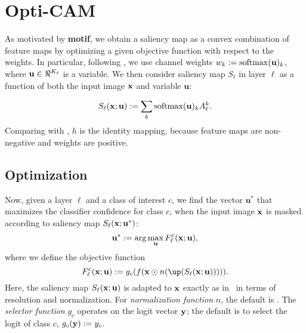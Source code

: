 \section{Opti-CAM}
As motivated by \textbf{motif}, we obtain a saliency map as a convex combination of feature maps
 by optimizing a given objective function with respect to the weights.
In particular, following \autocite{wang2020score}, we use channel weights $w_k \mathrel{:=} \operatorname{softmax}(
	\mathbf{u})_k$, where $\mathbf{u} \in \real^{K_\ell}$ is a variable.
We then consider saliency map $S_\ell$ in layer $\ell$ as a function of both the input image $\mathbf{x}$ 
and variable $\mathbf{u}$:

\begin{equation}
    S_\ell(\mathbf{x}; \mathbf{u}) \mathrel{:=} \sum_k \operatorname{softmax}(\mathbf{u})_k A^k_\ell.
\label{eq:v-sal}
\end{equation}
Comparing with , $h$ is the identity mapping, because feature maps are non-negative and
 weights are positive.


\subsection{Optimization}
Now, given a layer $\ell$ and a class of interest $c$, we find the vector $\mathbf{u}^*$ that
 maximizes the classifier confidence for class $c$, when the input image $\mathbf{x}$ is masked according 
 to saliency map $S_\ell(\mathbf{x}; \mathbf{u}^*)$:
\begin{equation}
	\mathbf{u}^* \mathrel{:=} \arg\max_{\mathbf{u}} F^c_\ell(\mathbf{x}; \mathbf{u}),
\label{eq:opt}
\end{equation}
where we define the objective function
\begin{equation}
	F^c_\ell(\vx; \mathbf{u}) \defn g_c(f(\vx \odot n(\up(S_\ell(\vx; \mathbf{u}))))).
\label{eq:obj}
\end{equation}
Here, the saliency map $S_\ell(\mathbf{x}; \mathbf{u})$ is adapted to $\mathbf{x}$ exactly as in~ in 
terms of resolution and normalization. For \emph{normalization function} $n$, the default is
 . 
The \emph{selector function} $g_c$ operates on the logit vector $\mathbf{y}$; the default is to select the
 logit of class $c$, \ie $g_c(\mathbf{y}) \mathrel{:=} y_c$. %


